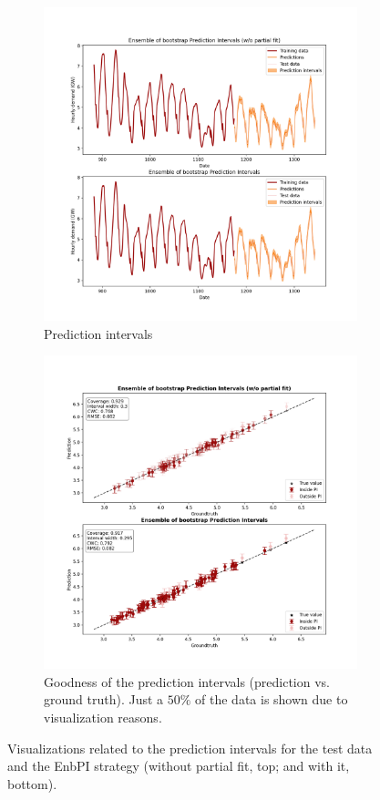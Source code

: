 \begin{figure}[ht]
    \centering
    \begin{subfigure}[b]{\textwidth}
        \centering
        \includegraphics[width=.8\textwidth]{Figures/timeseries/without-change-point/prediction-intervals-timeseries-problem.png}
        \caption{Prediction intervals}
        \label{subfig:app-timeseries-prediction-intervals}
    \end{subfigure}
    \hfill %
    \begin{subfigure}[b]{\textwidth} %
        \centering
        \includegraphics[width=.8\textwidth]{Figures/timeseries/without-change-point/average-goodness-timeseries-problem.png} %
        \caption{Goodness of the prediction intervals (prediction vs. ground truth). Just a $50\%$ of the data is shown due to visualization reasons.}
        \label{subfig:app-timeseries-intervals-goodness}
    \end{subfigure}
    \caption{Visualizations related to the prediction intervals for the test data and the EnbPI strategy (without partial fit, top; and with it, bottom).}
    \label{fig:app-timeseries-intervals}
\end{figure}

